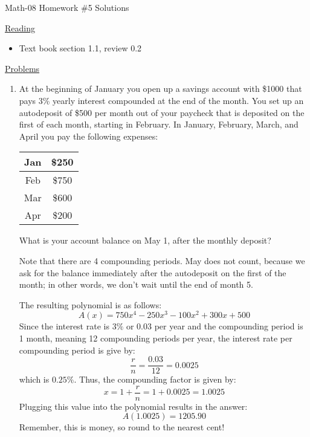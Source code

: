 \documentclass[letterpaper,12pt,fleqn]{article}
\begin{document}
\begin{center}
\Large Math-08 Homework \#5 Solutions
\end{center}

\vspace{0.5in}

\underline{Reading}

\begin{itemize}
\item Text book section 1.1, review 0.2
\end{itemize}

\underline{Problems}

\begin{enumerate}
\item At the beginning of January you open up a savings account with \$1000
  that pays 3\% yearly interest compounded at the end of the month. You set up
  an autodeposit of \$500 per month out of your paycheck that is deposited on
  the first of each month, starting in February. In January, February, March,
  and April you pay the following expenses:
  
  \begin{tabular}{|c|c|}
    \hline
    Jan & \$250 \\
    \hline
    Feb & \$750 \\
    \hline
    Mar & \$600 \\
    \hline
    Apr & \$200 \\
    \hline
  \end{tabular}
  
  What is your account balance on May 1, after the monthly deposit?

  \bigskip

  Note that there are 4 compounding periods. May does not count, because we
  ask for the balance immediately after the autodeposit on the first of the
  month; in other words, we don't wait until the end of month 5.

  The resulting polynomial is as follows:
  \[A(x)=750x^4-250x^3-100x^2+300x+500\]
  Since the interest rate is $3\%$ or $0.03$ per year and the compounding
  period is 1 month, meaning 12 compounding periods per year, the interest rate
  per compounding period is give by:
  \[\frac{r}{n}=\frac{0.03}{12}=0.0025\]
  which is $0.25\%$. Thus, the compounding factor is given by:
  \[x=1+\frac{r}{n}=1+0.0025=1.0025\]
  Plugging this value into the polynomial results in the answer:
  \[A(1.0025)=1205.90\]
  Remember, this is money, so round to the nearest cent!
  

\end{enumerate}
\end{document}
